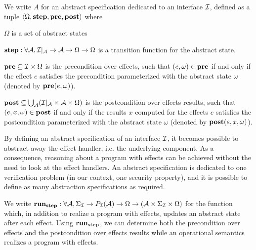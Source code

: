 \begin{definition} \label{def:freespec:abstract-specs}
  We write $A$ for an abstract specification dedicated to an interface $\mathcal{I}$,
  defined as a tuple $\langle \Omega, \mathbf{\mathbf{step}}, \mathbf{\mathbf{pre}}, \mathbf{\mathbf{post}}
  \rangle$ where
  \begin{compactitem}
  \item $\Omega$ is a set of abstract states
  \item $\mathbf{\mathbf{step}} : \forall \mathcal{A}, \mathcal{I}|_{\mathcal{A}}
    \rightarrow \mathcal{A} \rightarrow \Omega \rightarrow \Omega$
  is a transition function for the abstract state.
  \item $\mathbf{\mathbf{pre}} \subseteq \mathcal{I} \times \Omega$ is the precondition over
  effects, such that $(e, \omega) \in \mathbf{\mathbf{pre}}$ if and only if the effect $e$
  satisfies the precondition parameterized with the abstract state $\omega$
  (denoted by $\mathbf{\mathbf{pre}}(e, \omega)$).
  \item $\mathbf{\mathbf{post}} \subseteq \bigcup_{\mathcal{A}}
    (\mathcal{I}|_{\mathcal{A}} \times \mathcal{A} \times \Omega)$ is the
    postcondition over effects results, such that $(e, x, \omega) \in
    \mathbf{\mathbf{post}}$ if and only if the results $x$ computed for the effects $e$
    satisfies the postcondition parameterized with the abstract state $\omega$
    (denoted by $\mathbf{\mathbf{post}}(e, x, \omega)$).
  \end{compactitem}
\end{definition}

By defining an abstract specification of an interface $\mathcal{I}$, it becomes possible
to abstract away the effect handler, i.e. the underlying component.
%
As a consequence, reasoning about a program with effects can be achieved without
the need to look at the effect handlers.
%
An abstract specification is dedicated to one verification problem (in our
context, one security property), and it is possible to define as many
abstraction specifications as required.

We write $\mathbf{\mathbf{run}}_{\mathbf{\mathbf{step}}} : \forall \mathcal{A}, \Sigma_{\mathcal{I}}
\rightarrow P_{\mathcal{I}}(\mathcal{A}) \rightarrow \Omega \rightarrow (\mathcal{A}
\times \Sigma_{\mathcal{I}} \times \Omega)$ for the function which, in addition to
realize a program with effects, updates an abstract state after each effect.
%
Using $\mathbf{\mathbf{run}}_{\mathbf{\mathbf{step}}}$, we can determine both the precondition over
effects and the postcondition over effects results while an operational
semantics realizes a program with effects.

